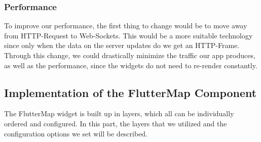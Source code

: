 \subsubsection{Performance}
To improve our performance, the first thing to change would be to move away from HTTP-Request to Web-Sockets. This would be a more suitable technology since only when the data on the server updates do we get an HTTP-Frame. Through this change, we could drastically minimize the traffic our app produces, as well as the performance, since the widgets do not need to re-render constantly.   

\subsection{Implementation of the FlutterMap Component}

The FlutterMap widget is built up in layers, which all can be individually ordered and configured. In this part, the layers that we utilized and the configuration options we set will be described. 

